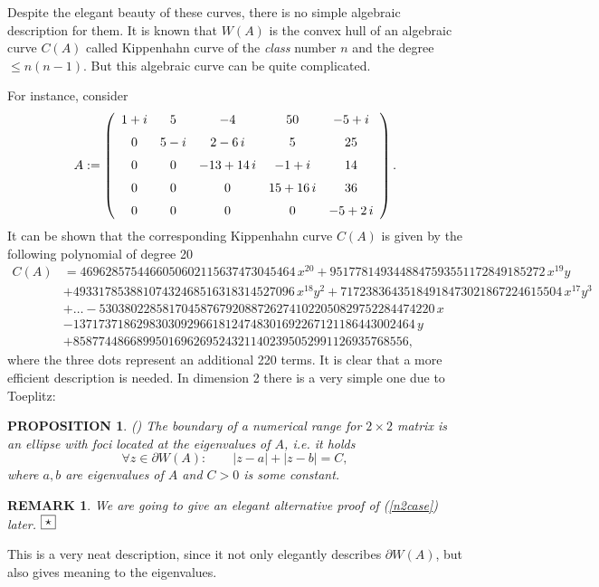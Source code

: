\documentclass[10pt,a4paper,reqno]{amsart}
\newtheorem{rem}[defi]{\bf R\scriptsize EMARK \normalsize}
\newtheorem{prop}[defi]{\bf P\scriptsize ROPOSITION \normalsize}
\def\kopr{\hfill\raisebox{3pt}{\framebox{$\star$}}}
\newenvironment{remark}{\begin{rem}\rm}{$\kopr$\end{rem}}
\newenvironment{proposition}{\begin{prop}\it}{\end{prop}}
\begin{document}
Despite the elegant beauty of these curves, there is no simple algebraic description for them. It is known that $W(A)$ is the convex hull of an algebraic curve $C(A)$ called Kippenhahn curve of the \textit{class} number $n$ and the degree $\leq n(n-1)$. But this algebraic curve can be quite complicated. 

For instance, consider
$$
A:=\left( \begin {array}{ccccc} 1+i&5&-4&50&-5+i\\ \noalign{\medskip}0&5
-i&2-6\,i&5&25\\ \noalign{\medskip}0&0&-13+14\,i&-1+i&14
\\ \noalign{\medskip}0&0&0&15+16\,i&36\\ \noalign{\medskip}0&0&0&0&-5+
2\,i\end {array} \right).
$$
It can be shown that the corresponding Kippenhahn curve $C(A)$ is given by the following polynomial of degree 20
\begin{align*}
C(A)&=4696285754466050602115637473045464\,{x}^{20}+
9517781493448847593551172849185272\,{x}^{19}y\\
&+49331785388107432468516318314527096\,{x}^{18}{y}^{2}+
71723836435184918473021867224615504\,{x}^{17}{y}^{3}\\
&+\dots -53038022858170458767920887262741022050829752284474220\,x\\
&-137173718629830309296618124748301692267121186443002464\,y\\
&+85877448668995016962695243211402395052991126935768556,
\end{align*}
where the three dots represent an additional 220 terms. It is clear that a more efficient description is needed.
In dimension 2 there is a very simple one due to Toeplitz: 
\begin{proposition}\label{n2prop}(\cite{Toeplitz})
The boundary of a numerical range for $2\times 2$ matrix is an ellipse with foci located at the eigenvalues of $A$, i.e. it holds
\begin{equation}\label{n2case}
\forall z\in\partial W(A):\qquad |z-a|+|z-b|=C,
\end{equation}
where $a,b$ are eigenvalues of $A$ and $C>0$ is some constant.
\end{proposition}
\begin{remark}
We are going to give an elegant alternative proof of (\ref{n2case}) later.
\end{remark}
This is a very neat description, since it not only elegantly describes $\partial W(A)$, but also gives meaning to the eigenvalues.
\end{document}
